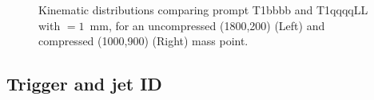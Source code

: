 \begin{figure}[h!]
\begin{center}
     \\
     ~
    \caption{Kinematic distributions comparing prompt T1bbbb and T1qqqqLL with \ctau$=1$~mm, for an
        uncompressed (1800,200) (Left) and compressed (1000,900) (Right) mass point.}
    \label{fig:T1qqqqLLvsT1bbbb}
  \end{center}
\end{figure}

\subsection{Trigger and jet ID}
\label{app:LLP-trigger}
%
%
%

